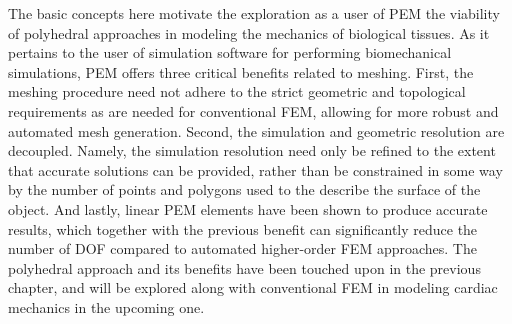 The basic concepts here motivate the exploration as a user of PEM the viability of polyhedral approaches in modeling the mechanics of biological tissues. As it pertains to the user of simulation software for performing biomechanical simulations, PEM offers three critical benefits related to meshing. First, the meshing procedure need not adhere to the strict geometric and topological requirements as are needed for conventional FEM, allowing for more robust and automated mesh generation. Second, the simulation and geometric resolution are decoupled. Namely, the simulation resolution need only be refined to the extent that accurate solutions can be provided, rather than be constrained in some way by the number of points and polygons used to the describe the surface of the object. And lastly, linear PEM elements have been shown to produce accurate results, which together with the previous benefit can significantly reduce the number of DOF compared to automated higher-order FEM approaches. The polyhedral approach and its benefits have been touched upon in the previous chapter, and will be explored along with conventional FEM in modeling cardiac mechanics in the upcoming one.

